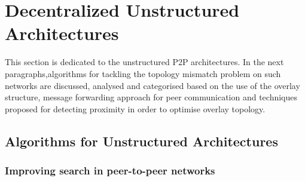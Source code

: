 \section{Decentralized Unstructured Architectures}
\label{section:unstructured}

This section is dedicated to the unstructured P2P architectures. In the next
paragraphs,algorithms for tackling the topology mismatch problem on such
networks are discussed, analysed and categorised based on the use of the
overlay structure, message forwarding approach for peer communication and
techniques proposed for detecting proximity in order to optimise overlay
topology.


%
%
%


\subsection{Algorithms for Unstructured Architectures}


\subsubsection{Improving search in peer-to-peer networks}

